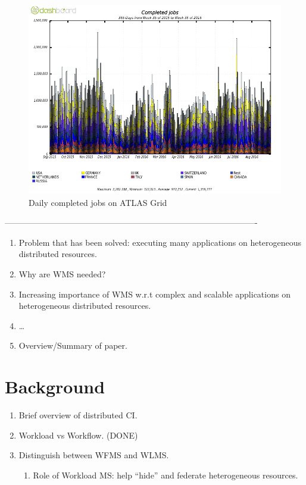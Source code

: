\documentclass[10pt, conference, compsocconf]{IEEEtran}
\begin{document}
\begin{figure}
\begin{center}
\includegraphics[width=\columnwidth]{figures/DailyJobs.png}
\caption{Daily completed jobs on ATLAS Grid\label{fig:daily}}
\end{center}
\end{figure}

-------------------------------------------------------------------------------------------
\begin{enumerate}
  \item Problem that has been solved: executing many applications on heterogeneous distributed resources.
  \item Why are WMS needed?
  \item Increasing importance of WMS w.r.t complex and scalable applications on heterogeneous distributed resources.
  \item \ldots
  \item Overview/Summary of paper.
\end{enumerate}

\section{Background}
\label{sec:background}

\begin{enumerate}
  \item Brief overview of distributed CI.
  \item Workload vs Workflow. (DONE)
  \item Distinguish between WFMS and WLMS.
  \begin{enumerate}
    \item Role of Workload MS: help ``hide'' and federate heterogeneous resources.
  \end{enumerate}
\end{enumerate}
\end{document}
